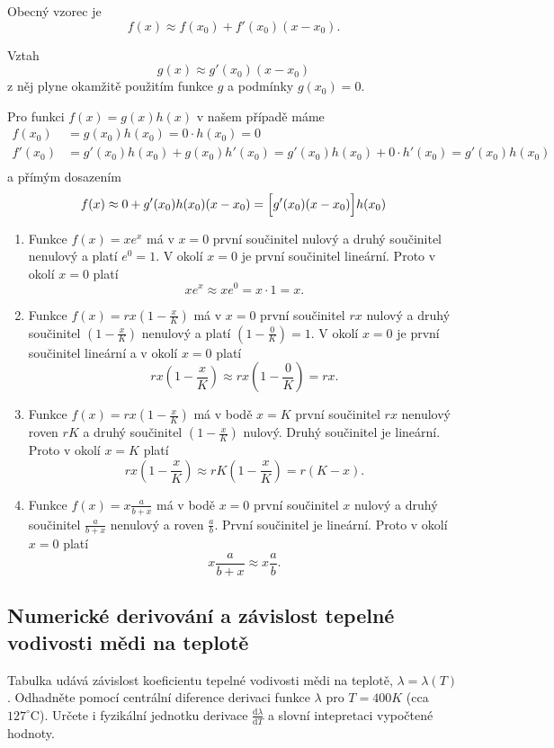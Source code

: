 \reseni

Obecný vzorec je
$$f(x)\approx f(x_0)+f'(x_0)(x-x_0).$$

Vztah $$g(x)\approx g'(x_0)(x-x_0)$$ z něj plyne okamžitě použitím funkce $g$ a podmínky $g(x_0)=0$.

Pro funkci $f(x)=g(x)h(x)$ v našem případě máme
$$
\begin{aligned}
f(x_0)&=g(x_0)h(x_0)=0\cdot  h(x_0)=0\\
f'(x_0)&=g'(x_0)h(x_0)+g(x_0)h'(x_0)=g'(x_0)h(x_0)+0\cdot h'(x_0)=g'(x_0)h(x_0)\\
\end{aligned}
$$
a přímým dosazením
$$f(x)\approx 0+g'(x_0)h(x_0)(x-x_0)=\Bigl[g'(x_0)(x-x_0)\Bigr]h(x_0)$$
\begin{enumerate}
\item Funkce $f(x)=xe^x$ má v $x=0$ první součinitel nulový a druhý součinitel nenulový a platí $e^0=1$. V okolí $x=0$ je první součinitel
  lineární.  Proto v okolí
  $x=0$ platí
  $$xe^x\approx xe^0=x\cdot 1=x.$$
\item Funkce $f(x)=rx\left(1-\frac xK\right)$ má v $x=0$ první
součinitel $rx$ nulový a  
druhý součinitel $\left(1-\frac xK\right)$ nenulový a platí
$\left(1-\frac 0K\right)=1$. V okolí $x=0$ je první součinitel lineární a v okolí $x=0$ platí
  $$rx\left(1-\frac xK\right)\approx rx\left(1-\frac 0K\right)=rx.$$
\item Funkce $f(x)=rx\left(1-\frac xK\right)$ má v bodě $x=K$ první součinitel $rx$ nenulový roven $rK$ a
   druhý součinitel $\left(1-\frac xK\right)$ nulový. Druhý součinitel je lineární. Proto v okolí
  $x=K$ platí
  $$rx\left(1-\frac xK\right)\approx rK\left(1-\frac xK\right)=r(K-x).$$
\item Funkce $f(x)=x\frac {a}{b+x}$ má v bodě $x=0$ první součinitel $x$ nulový  a
   druhý součinitel $\frac {a}{b+x}$ nenulový a roven $\frac ab$. První součinitel je lineární. Proto v okolí
  $x=0$ platí
  $$x\frac a{b+x}\approx x\frac ab.$$
\end{enumerate}

\konec

\stranka


\subsection{Numerické derivování a závislost tepelné vodivosti mědi na teplotě}


Tabulka udává závislost koeficientu tepelné vodivosti mědi na teplotě, $\lambda=\lambda(T)$. Odhadněte pomocí centrální diference derivaci funkce $\lambda$ pro $T=400K$ (cca $127^\circ \mathrm C$). Určete i fyzikální jednotku derivace $\frac{\mathrm d\lambda}{\mathrm dT}$ a slovní intepretaci vypočtené hodnoty.

